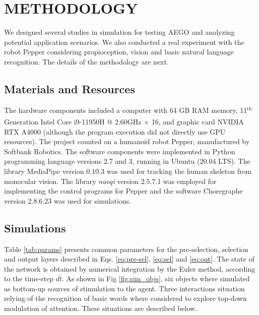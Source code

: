 \documentclass[letterpaper, 10 pt, conference]{ieeeconf}  %
\begin{document}
	\section{METHODOLOGY}
	\label{sec:methodology}

	We designed several studies in simulation for testing AEGO and analyzing potential application scenarios. We also conducted a real experiment with the robot Pepper considering propioception, vision and basic natural language recognition. The details of the methodology are next.

	\subsection{Materials and Resources}
	
	The hardware components included a computer with 64 GB RAM memory, 11${}^\mathrm{th}$ Generation Intel\textsuperscript{\textregistered} Core\textsuperscript{\texttrademark} i9-11950H @ 2.60GHz × 16, and graphic card NVIDIA RTX A4000 (although the program execution did not directly use GPU resources). The project counted on a humanoid robot Pepper, manufactured by Softbank Robotics. The software components were implemented in Python programming language versions 2.7 and 3, running in Ubuntu (20.04 LTS). The library MediaPipe version 0.10.3 was used for tracking the human skeleton from monocular vision. The library \textit{naoqi} version 2.5.7.1 was employed for implementing the control programs  for Pepper and the software Choregraphe version 2.8.6.23 was used for simulations. 
	
	\subsection{Simulations}
	
	Table \ref{tab:params} presents common parameters for the pre-selection, selection and output layers described in Eqs. \eqref{eq:pre-sel}, \eqref{eq:sel} and \eqref{eq:out}. The state of the network is obtained by numerical integration by the Euler method, according to the time-step $dt$. As shown in Fig \ref{fig:sim_objs}, six objects where simulated as bottom-up sources of stimulation to the agent. Three interactions situation relying of the recognition of basic words where considered to explore top-down modulation of attention. These situations are described below.
	
	\renewcommand{\arraystretch}{1.2} %
	
\end{document}
